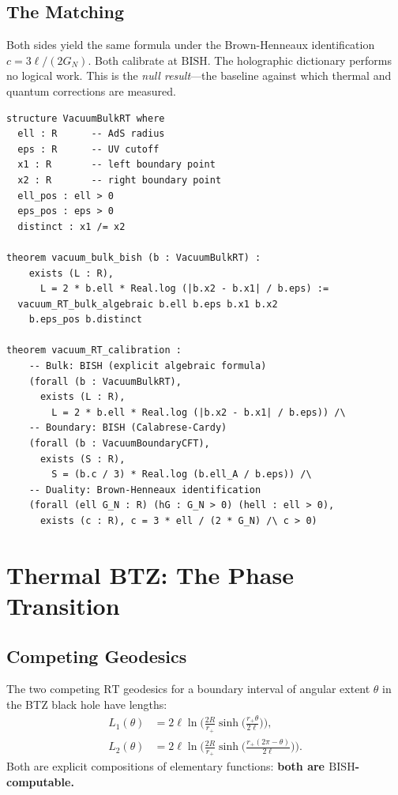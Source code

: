 \documentclass[11pt,a4paper]{article}
\theoremstyle{plain}
\theoremstyle{definition}
\newcommand{\BISH}{\ensuremath{\mathrm{BISH}}}
\newcommand{\RT}{\ensuremath{\mathrm{RT}}}
\newcommand{\GN}{\ensuremath{G_N}}
\begin{document}
\subsection{The Matching}

Both sides yield the same formula under the Brown-Henneaux
identification $c = 3\ell/(2\GN)$.  Both calibrate at $\BISH$.
The holographic dictionary performs no logical work.  This is the
\emph{null result}---the baseline against which thermal and quantum
corrections are measured.

\begin{lstlisting}[caption={Vacuum $\RT$ calibration: \texttt{VacuumAdS3.lean}}]
structure VacuumBulkRT where
  ell : R      -- AdS radius
  eps : R      -- UV cutoff
  x1 : R       -- left boundary point
  x2 : R       -- right boundary point
  ell_pos : ell > 0
  eps_pos : eps > 0
  distinct : x1 /= x2

theorem vacuum_bulk_bish (b : VacuumBulkRT) :
    exists (L : R),
      L = 2 * b.ell * Real.log (|b.x2 - b.x1| / b.eps) :=
  vacuum_RT_bulk_algebraic b.ell b.eps b.x1 b.x2
    b.eps_pos b.distinct

theorem vacuum_RT_calibration :
    -- Bulk: BISH (explicit algebraic formula)
    (forall (b : VacuumBulkRT),
      exists (L : R),
        L = 2 * b.ell * Real.log (|b.x2 - b.x1| / b.eps)) /\
    -- Boundary: BISH (Calabrese-Cardy)
    (forall (b : VacuumBoundaryCFT),
      exists (S : R),
        S = (b.c / 3) * Real.log (b.ell_A / b.eps)) /\
    -- Duality: Brown-Henneaux identification
    (forall (ell G_N : R) (hG : G_N > 0) (hell : ell > 0),
      exists (c : R), c = 3 * ell / (2 * G_N) /\ c > 0)
\end{lstlisting}

\section{Thermal BTZ: The Phase Transition}\label{sec:btz}

\subsection{Competing Geodesics}

The two competing $\RT$ geodesics for a boundary interval of
angular extent $\theta$ in the BTZ black hole have lengths:
\begin{align*}
  L_1(\theta) &= 2\ell \ln\!\bigl(\tfrac{2R}{r_+}
    \sinh\!\bigl(\tfrac{r_+ \theta}{2\ell}\bigr)\bigr), \\
  L_2(\theta) &= 2\ell \ln\!\bigl(\tfrac{2R}{r_+}
    \sinh\!\bigl(\tfrac{r_+(2\pi - \theta)}{2\ell}\bigr)\bigr).
\end{align*}
Both are explicit compositions of elementary functions:
\textbf{both are $\BISH$-computable.}
\end{document}
